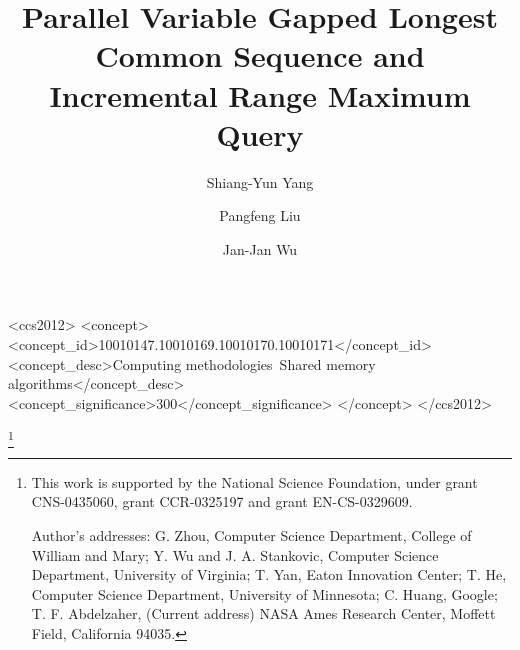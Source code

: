 \documentclass[format=acmsmall, review=false, screen=true]{acmart}
\newcommand*{\PartialPath}{../partial}
\begin{document}
\title[Parallel VGLCS and IRMQ]{Parallel Variable Gapped Longest Common Sequence and Incremental Range Maximum Query}  
\author{Shiang-Yun Yang}
\author{Pangfeng Liu}
\author{Jan-Jan Wu}



%
%
\begin{CCSXML}
<ccs2012>
<concept>
<concept_id>10010147.10010169.10010170.10010171</concept_id>
<concept_desc>Computing methodologies~Shared memory algorithms</concept_desc>
<concept_significance>300</concept_significance>
</concept>
</ccs2012>
\end{CCSXML}


%
%






\thanks{This work is supported by the National Science Foundation,
  under grant CNS-0435060, grant CCR-0325197 and grant EN-CS-0329609.

  Author's addresses: G. Zhou, Computer Science Department, College of
  William and Mary; Y. Wu {and} J. A. Stankovic, Computer Science
  Department, University of Virginia; T. Yan, Eaton Innovation Center;
  T. He, Computer Science Department, University of Minnesota; C.
  Huang, Google; T. F. Abdelzaher, (Current address) NASA Ames
  Research Center, Moffett Field, California 94035.}


\maketitle
\end{document}
